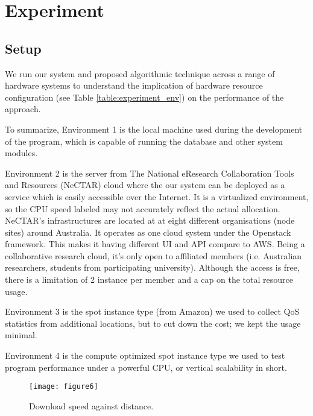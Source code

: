 \documentclass[journal]{IEEEtran}
\begin{document}
\section{Experiment}\label{experiment}


\subsection{Setup}

We run our system and proposed algorithmic technique across a range of hardware systems to understand the implication of hardware resource configuration (see Table \ref{table:experiment_env}) on the performance of the approach.


To summarize, Environment 1 is the local machine used during the development of the program, which is capable of running the database and other system modules.


Environment 2 is the server from The National eResearch Collaboration Tools and Resources (NeCTAR) cloud \cite{ref40} where the our system can be deployed as a service which is easily accessible over the Internet. It is a virtualized environment, so the CPU speed labeled may not accurately reflect the actual allocation.
NeCTAR's infrastructures are located at at eight different organisations (node sites) around Australia. It operates as one cloud system under the Openstack framework. This makes it having different UI and API compare to AWS. Being a collaborative research cloud, it's only open to affiliated members (i.e. Australian researchers, students from participating university). Although the access is free, there is a limitation of 2 instance per member and a cap on the total resource usage. 


Environment 3 is the spot instance type (from Amazon) we used to collect QoS statistics from additional locations, but to cut down the cost; we kept the usage minimal.


Environment 4 is the compute optimized spot instance type we used to test program performance under a powerful CPU, or vertical scalability in short.

\begin{figure}[!h]
 \centering
 \texttt{[image: figure6]}
 \caption{Download speed against distance.}
\label{fig6}
\end{figure}
 
\end{document}
